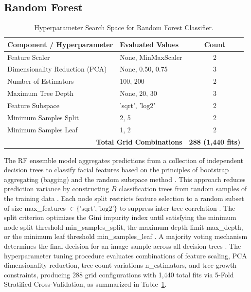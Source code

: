 \subsection{Random Forest}
\label{sec:random_forest}

\begin{table}[htbp]
\caption{Hyperparameter Search Space for Random Forest Classifier.}
\label{tab:III}
\centering
\begin{tabular}{llc}
\toprule
Component / Hyperparameter & Evaluated Values & Count \\
\midrule
Feature Scaler & None, MinMaxScaler & 2 \\
Dimensionality Reduction (PCA) & None, 0.50, 0.75 & 3 \\
Number of Estimators & 100, 200 & 2 \\
Maximum Tree Depth & None, 20, 30 & 3 \\
Feature Subspace & 'sqrt', 'log2' & 2 \\
Minimum Samples Split & 2, 5 & 2 \\
Minimum Samples Leaf & 1, 2 & 2 \\
\midrule
\multicolumn{2}{r}{\textbf{Total Grid Combinations}} & \textbf{288 (1,440 fits)} \\
\bottomrule
\end{tabular}
\end{table}

The RF ensemble model aggregates predictions from a collection of independent decision trees to classify facial features based on the principles of bootstrap aggregating (bagging) and the random subspace method \cite{ref30}. This approach reduces prediction variance by constructing $B$ classification trees from random samples of the training data \cite{ref31}. Each node split restricts feature selection to a random subset of size max\_features $\in \{\text{'sqrt'}, \text{'log2'}\}$ to suppress inter-tree correlation \cite{ref32}. The split criterion optimizes the Gini impurity index until satisfying the minimum node split threshold min\_samples\_split, the maximum depth limit max\_depth, or the minimum leaf threshold min\_samples\_leaf \cite{ref33}. A majority voting mechanism determines the final decision for an image sample across all decision trees \cite{ref34}. The hyperparameter tuning procedure evaluates combinations of feature scaling, PCA dimensionality reduction, tree count variations n\_estimators, and tree growth constraints, producing 288 grid configurations with 1,440 total fits via 5-Fold Stratified Cross-Validation, as summarized in Table~\ref{tab:III}.
